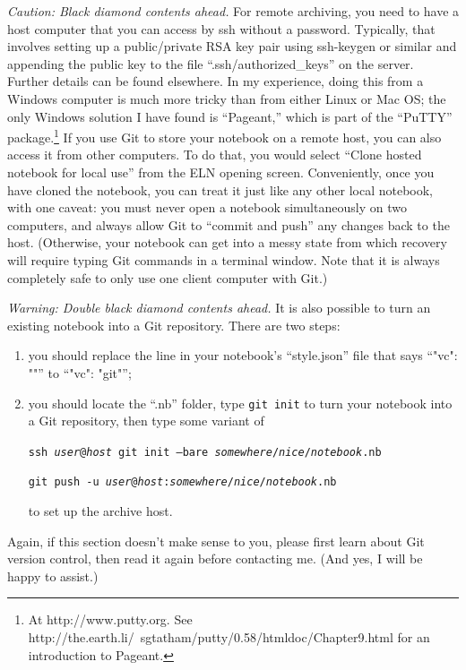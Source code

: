 \documentclass[11pt]{report}
\def\terminal#1{{\tt#1}}
\begin{document}
\emph{Caution: Black diamond contents ahead.} For remote archiving,
you need to have a host computer that you can access by ssh
without a password. Typically, that involves setting up a
public/private RSA key pair using ssh-keygen or similar and appending
the public key to the file ``.ssh/authorized\_keys'' on the
server. Further details can be found elsewhere. In my experience,
doing this from a Windows computer is much more tricky than from
either Linux or Mac OS; the only Windows solution I have found is
``Pageant,'' which is part of the ``PuTTY'' package.\footnote{At
http://www.putty.org. See
http://the.earth.li/~sgtatham/putty/0.58/htmldoc/Chapter9.html for an
introduction to Pageant.} If you use Git to store your notebook on a
remote host, you can also access it from other computers. To do that,
you would select ``Clone hosted notebook for local use'' from the ELN
opening screen. Conveniently, once you have cloned the notebook, you
can treat it just like any other local notebook, with one caveat: you
must never open a notebook simultaneously on two computers, and always
allow Git to ``commit and push'' any changes back to the
host. (Otherwise, your notebook can get into a messy state from which
recovery will require typing Git commands in a terminal
window. Note that it is always completely safe to only use one client
computer with Git.)

\emph{Warning: Double black diamond contents ahead.} It is also
possible to turn an existing notebook into a Git repository. There are
two steps:
\begin{enumerate}
  \item you should replace the line in your notebook's
    ``style.json'' file that says ``"vc": ""'' to ``"vc": "git"'';
    \item you
should locate the ``.nb'' folder, type \terminal{git init} to turn your
notebook into a Git repository, then type some variant of

\terminal{ssh
\emph{user}@\emph{host} git init --bare
\emph{somewhere}/\emph{nice}/\emph{notebook}.nb}\vspace{-5pt}

\terminal{git push -u
\emph{user}@\emph{host}:\emph{somewhere}/\emph{nice}/\emph{notebook}.nb}

to set up the archive host.
\end{enumerate}
Again, if this section doesn't make sense to you, please first learn
about Git version control, then read it again before
contacting me. (And yes, I will be happy to assist.)
\end{document}
